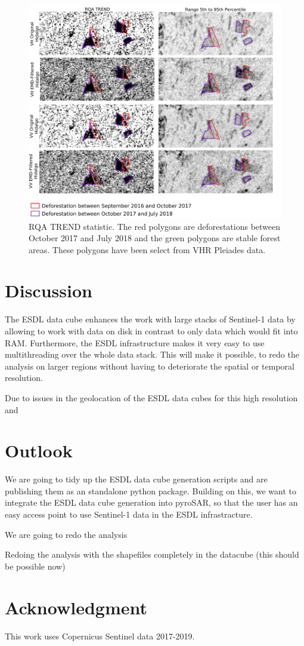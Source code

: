 \documentclass{article}
\begin{document}
\begin{figure}
  \includegraphics[width=\textwidth]{figs/rqa_trend_0317_0319.png}
  \caption{RQA TREND statistic.  The red polygons are deforestations between October 2017 and July 2018 and the green polygons are stable forest areas.
  These polygons have been select from VHR Pleiades data.}
  \label{trend}
\end{figure}


\section{Discussion}

The ESDL data cube enhances the work with large stacks of Sentinel-1 data by allowing to work with data on disk
in contrast to only data which would fit into RAM.
Furthermore, the ESDL infrastructure makes it very easy to use multithreading over the whole data stack. 
This will make it possible, to redo the analysis on larger regions without having to deteriorate the spatial or temporal resolution.

Due to issues in the geolocation of the ESDL data cubes for this high resolution and 

\section{Outlook}
We are going to tidy up the ESDL data cube generation scripts and are publishing them as an standalone python package. 
Building on this, we want to integrate the ESDL data cube generation into pyroSAR, 
so that the user has an easy access point to use Sentinel-1 data in the ESDL infrastracture. 

We are going to redo the analysis 

Redoing the analysis with the shapefiles completely in the datacube (this should be possible now)



\section*{Acknowledgment}
This work uses Copernicus Sentinel data 2017-2019.




\end{document}
